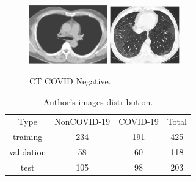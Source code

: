 \documentclass[runningheads]{llncs}
\begin{document}
\begin{figure}[H]
\centering
{
\includegraphics[width=0.30\textwidth]{imagesDatasetSection/noncovid1.jpg}
}
\quad
{
\includegraphics[width=0.27\textwidth]{imagesDatasetSection/noncovid2.jpg}
}
\label{covidNegative}
\caption{CT COVID Negative.}
\end{figure}

\begin{table}[H]
\label{imageDistributionAuthors}
\centering
\caption{Author's images distribution.}
\begin{tabular}{c|c|c|c}
\cline{1-4}
Type & NonCOVID-19 & COVID-19 & Total \\ \cline{1-4}
training & 234 & 191 & 425\\ \cline{1-4}
validation & 58 & 60 & 118\\ \cline{1-4}
test & 105  & 98 & 203\\ \cline{1-4}
\end{tabular}
\end{table} 
\end{document}
